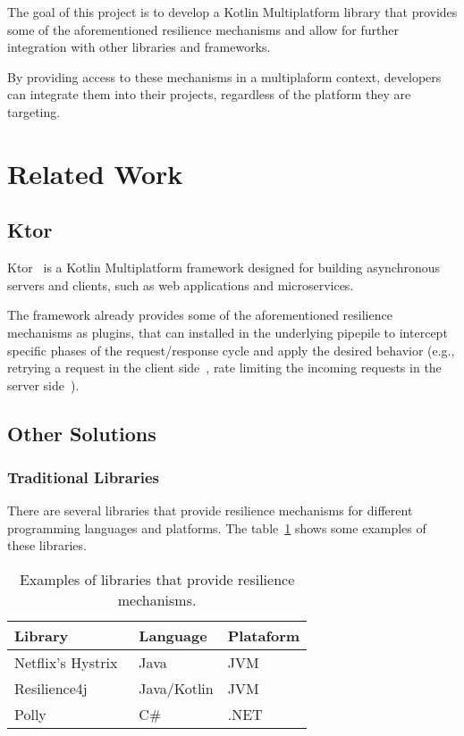 The goal of this project is to develop a Kotlin Multiplatform library that provides some of the aforementioned resilience mechanisms and allow for further integration with other libraries and frameworks.

By providing access to these mechanisms in a multiplaform context, developers can integrate them into their projects, regardless of the platform they are targeting.


\section{Related Work}\label{sec:related-work}

\subsection{Ktor}\label{subsec:ktor}
Ktor~\cite{ktor} is a Kotlin Multiplatform framework designed for building asynchronous servers and clients, such as web applications and microservices.

The framework already provides some of the aforementioned resilience mechanisms as plugins, that can installed in the underlying pipepile to intercept specific phases of the request/response cycle and apply the desired behavior (e.g., retrying a request in the client side~\cite{ktor-client-retry}, rate limiting the incoming requests in the server side~\cite{ktor-server-rate-limit}).

\subsection{Other Solutions}\label{subsec:other-solutions}

\subsubsection{Traditional Libraries}

There are several libraries that provide resilience mechanisms for different programming languages and platforms.
The table~\ref{tab:resilience_libraries} shows some examples of these libraries.

\begin{table}[!htb]
    \centering
    \caption{Examples of libraries that provide resilience mechanisms.}
    \label{tab:resilience_libraries}
    \vspace{0.3cm}
    \begin{tabular}{|l|l|l}
        \hline
        \textbf{Library}                         & \textbf{Language} & \textbf{Plataform} \\ \hline
        Netflix's Hystrix~\cite{netflix-hystrix} & Java              & JVM                \\ \hline
        Resilience4j~\cite{resilience4j}         & Java/Kotlin       & JVM                \\ \hline
        Polly ~\cite{polly-dotnet}               & C\#               & .NET               \\
        \hline
    \end{tabular}
\end{table}

